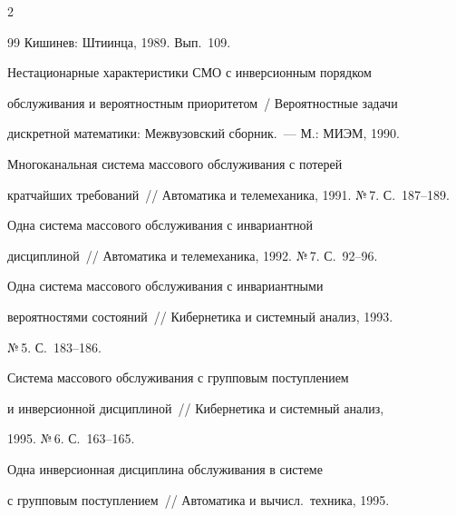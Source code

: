 \begin{multicols}{2}
{{\begin{thebibliography}{99}
Кишинев: Штиинца, 1989. Вып.~109.









Нестационарные характеристики СМО с инверсионным порядком


обслуживания и вероятностным приоритетом~/ Вероятностные задачи


дискретной математики: Межвузовский сборник.~--- М.: МИЭМ, 1990.









Многоканальная система массового обслуживания с потерей


кратчайших требований~// Автоматика и телемеханика, 1991. №\,7. С.~187--189.







 Одна система массового обслуживания с инвариантной


дисциплиной~// Автоматика и телемеханика, 1992. №\,7. С.~92--96.









Одна система массового обслуживания с инвариантными


вероятностями состояний~// Кибернетика и системный анализ, 1993.


№\,5. С.~183--186.









Система массового обслуживания с групповым поступлением


и инверсионной дисциплиной~// Кибернетика и системный анализ,


1995. №\,6. С.~163--165.









Одна инверсионная дисциплина обслуживания в системе


с групповым поступлением~// Автоматика и вычисл.\ техника, 1995.



\end{thebibliography}}}
\end{multicols}
